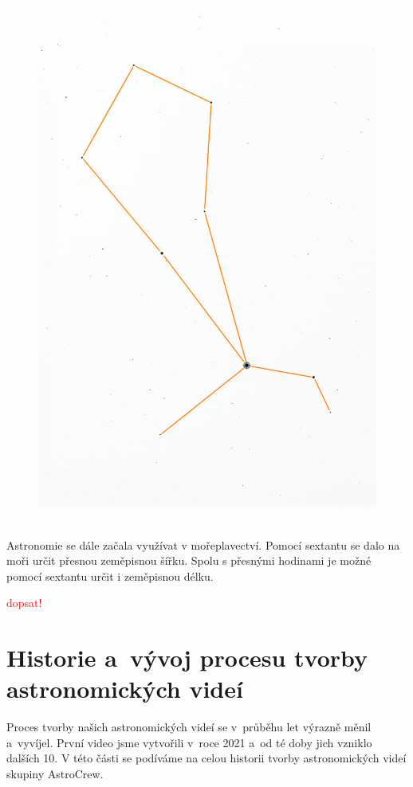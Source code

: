 \documentclass[12pt,a4paper,titlepage]{article}
\newcommand{\todo}[1]{\textcolor{red}{#1}}
\begin{document}
\begin{figure}[H]
\begin{minipage}{.45\textwidth}
	  \includegraphics[width=1\linewidth]{2025.png}
	  ~\label{fig:2025}
	\end{minipage}
\end{figure}

Astronomie se dále začala využívat v mořeplavectví. Pomocí sextantu se dalo na moři určit přesnou zeměpisnou šířku. Spolu s přesnými hodinami je možné pomocí sextantu určit i zeměpisnou délku.

\todo{dopsat!}

\section{Historie a~vývoj procesu tvorby astronomických videí}
Proces tvorby našich astronomických videí se v~průběhu let výrazně měnil a~vyvíjel. První video jsme vytvořili v~roce 2021 a~od té doby jich vzniklo dalších 10. V této části se podíváme na celou historii tvorby astronomických videí skupiny Astro\-Crew.
\end{document}
